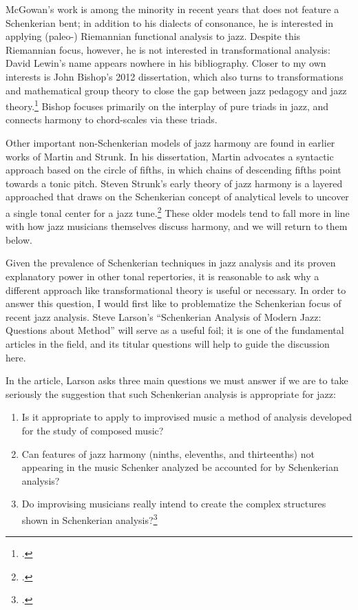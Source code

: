 \documentclass[diss]{subfiles}
\begin{document}
McGowan’s work is among the minority in recent years that does not feature a
Schenkerian bent; in addition to his dialects of consonance, he is interested
in applying (paleo-) Riemannian functional analysis to jazz. Despite
this Riemannian focus, however, he is not interested in transformational
analysis: David Lewin’s name appears nowhere in his bibliography.
Closer to my own interests is John Bishop’s 2012 dissertation, which also
turns to transformations and mathematical group theory to close the gap
between jazz pedagogy and jazz theory.\footcite{bishop:2012} Bishop focuses
primarily on the interplay of pure triads in jazz, and connects harmony to
chord-scales via these triads.

Other important non-Schenkerian models of jazz harmony are found in earlier
works of Martin and Strunk. In his dissertation, Martin advocates a syntactic
approach based on the circle of fifths, in which chains of descending fifths
point towards a tonic pitch. Steven Strunk’s early theory of jazz
harmony is a layered approached that draws on the Schenkerian concept of
analytical levels to uncover a single tonal center for a jazz
tune.\footcite{strunk:1979} These older models tend to fall more in line with
how jazz musicians themselves discuss harmony, and we will return to them
below.

Given the prevalence of Schenkerian techniques in jazz analysis and its proven
explanatory power in other tonal repertories, it is reasonable to ask why a
different approach like transformational theory is useful or necessary. In
order to answer this question, I would first like to problematize the
Schenkerian focus of recent jazz analysis. Steve Larson’s “Schenkerian
Analysis of Modern Jazz: Questions about Method” will serve as a useful foil;
it is one of the fundamental articles in the field, and its titular questions
will help to guide the discussion here.

In the article, Larson asks three main questions we must answer if we are to
take seriously the suggestion that such Schenkerian analysis is appropriate
for jazz:
\begin{enumerate}
  \singlespacing
  \item Is it appropriate to apply to improvised music a method of analysis
    developed for the study of composed music?
  \item Can features of jazz harmony (ninths, elevenths, and thirteenths) not
    appearing in the music Schenker analyzed be accounted for by Schenkerian
    analysis?
  \item Do improvising musicians really intend to create the complex
    structures shown in Schenkerian analysis?\footcite[210]{larson:1998}
\end{enumerate}
\end{document}
